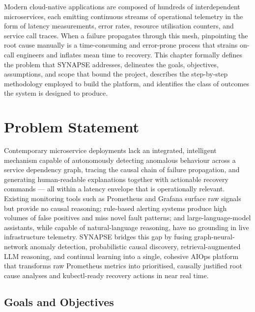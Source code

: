
\hspace*{0.3in} Modern cloud-native applications are composed of hundreds of interdependent microservices, each emitting continuous streams of operational telemetry in the form of latency measurements, error rates, resource utilisation counters, and service call traces. When a failure propagates through this mesh, pinpointing the root cause manually is a time-consuming and error-prone process that strains on-call engineers and inflates mean time to recovery. This chapter formally defines the problem that SYNAPSE addresses, delineates the goals, objectives, assumptions, and scope that bound the project, describes the step-by-step methodology employed to build the platform, and identifies the class of outcomes the system is designed to produce.\\

\section{Problem Statement}

\hspace*{0.3in} Contemporary microservice deployments lack an integrated, intelligent mechanism capable of autonomously detecting anomalous behaviour across a service dependency graph, tracing the causal chain of failure propagation, and generating human-readable explanations together with actionable recovery commands — all within a latency envelope that is operationally relevant. Existing monitoring tools such as Prometheus and Grafana surface raw signals but provide no causal reasoning; rule-based alerting systems produce high volumes of false positives and miss novel fault patterns; and large-language-model assistants, while capable of natural-language reasoning, have no grounding in live infrastructure telemetry. SYNAPSE bridges this gap by fusing graph-neural-network anomaly detection, probabilistic causal discovery, retrieval-augmented LLM reasoning, and continual learning into a single, cohesive AIOps platform that transforms raw Prometheus metrics into prioritised, causally justified root cause analyses and kubectl-ready recovery actions in near real time.\\

\subsection{Goals and Objectives}

